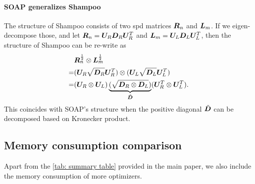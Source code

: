 \paragraph{SOAP generalizes Shampoo} The structure of Shampoo consists of two \gls{spd} matrices ${\bm{R}}_n$ and ${\bm{L}}_m$. If we eigen-decompose those, and let ${\bm{R}}_n={\bm{U}}_R{\bm{D}}_R{\bm{U}}_R^T$ and ${\bm{L}}_m={\bm{U}}_L{\bm{D}}_L{\bm{U}}_L^T$, then the structure of Shampoo can be re-write as 
\begin{align*}
    &{\bm{R}}_n^{\frac{1}{2}}\otimes {\bm{L}}_m^{\frac{1}{2}}\\
    =&({\bm{U}}_R\sqrt{{\bm{D}}_R}{\bm{U}}_R^T)\otimes({\bm{U}}_L\sqrt{{\bm{D}}_L}{\bm{U}}_L^T)\\
    =& ({\bm{U}}_R\otimes {\bm{U}}_L)\underbrace{(\sqrt{{\bm{D}}_R\otimes {\bm{D}}_L})}_{\tilde{{\bm{D}}}} ({\bm{U}}_R^T\otimes {\bm{U}}_L^T).
\end{align*}
This coincides with SOAP's structure when the positive diagonal $\tilde{{\bm{D}}}$ can be decomposed based on Kronecker product. 

\subsection{Memory consumption comparison}
\label{subapp: more thorough memory consumption}
\begin{table}[h]
\centering
Apart from the \cref{tab: summary table} provided in the main paper, we also include the memory consumption of more optimizers. 
\caption{The memory consumption of low-rank optimizers. Here, we assume the weight has a shape $m\times n$ with $m<n$ and $r\ll m$. Note that memory consumption $n$ and $r^2$ is typically very small. For example, let's take the largest possible $n=30K$ at the output layer. For 1B LLaMA, we select $r=512$, leading to $r^2\approx 262K$, which is 8x larger than $n$. However, both are marginal compared to $mr = 5120\times512$, which is 10x larger than $r^2$, and 80x larger than $n$.}
\label{tab: memory consumption for low-rank}
\end{table}



